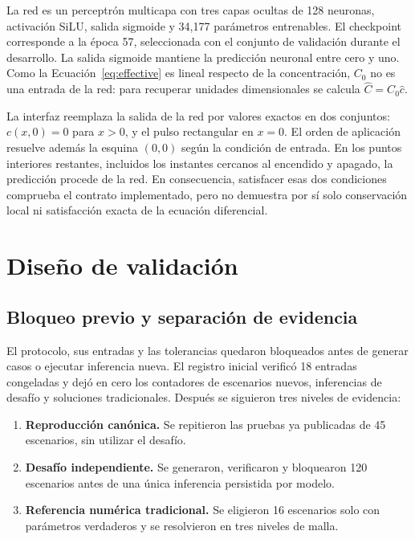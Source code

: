 \documentclass[11pt,a4paper]{article}
\begin{document}
La red es un perceptrón multicapa con tres capas ocultas de 128 neuronas,
activación SiLU, salida sigmoide y 34,177 parámetros entrenables. El checkpoint
corresponde a la época 57, seleccionada con el conjunto de validación durante
el desarrollo. La salida sigmoide mantiene la predicción neuronal entre cero y
uno. Como la Ecuación~\eqref{eq:effective} es lineal respecto de la
concentración, $C_0$ no es una entrada de la red: para recuperar unidades
dimensionales se calcula $\widehat C=C_0\widehat c$.

La interfaz reemplaza la salida de la red por valores exactos en dos conjuntos:
$c(x,0)=0$ para $x>0$, y el pulso rectangular en $x=0$. El orden de aplicación
resuelve además la esquina $(0,0)$ según la condición de entrada. En los puntos
interiores restantes, incluidos los instantes cercanos al encendido y apagado,
la predicción procede de la red. En consecuencia, satisfacer esas dos
condiciones comprueba el contrato implementado, pero no demuestra por sí solo
conservación local ni satisfacción exacta de la ecuación diferencial.

\section{Diseño de validación}

\subsection{Bloqueo previo y separación de evidencia}

El protocolo, sus entradas y las tolerancias quedaron bloqueados antes de
generar casos o ejecutar inferencia nueva. El registro inicial verificó 18
entradas congeladas y dejó en cero los contadores de escenarios nuevos,
inferencias de desafío y soluciones tradicionales. Después se siguieron tres
niveles de evidencia:

\begin{enumerate}
    \item \textbf{Reproducción canónica.} Se repitieron las pruebas ya
    publicadas de 45 escenarios, sin utilizar el desafío.
    \item \textbf{Desafío independiente.} Se generaron, verificaron y bloquearon
    120 escenarios antes de una única inferencia persistida por modelo.
    \item \textbf{Referencia numérica tradicional.} Se eligieron 16 escenarios
    solo con parámetros verdaderos y se resolvieron en tres niveles de malla.
\end{enumerate}
\end{document}
